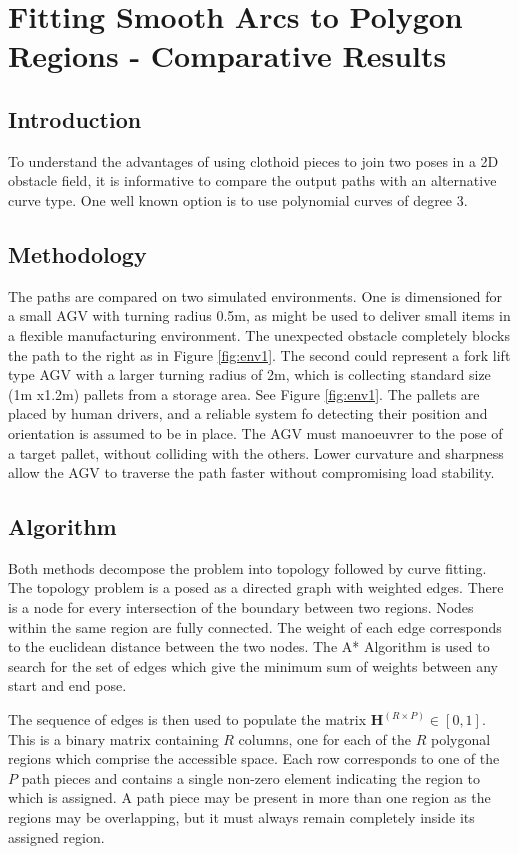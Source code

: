 \chapter{Fitting Smooth Arcs to Polygon Regions - Comparative Results}

\section{Introduction}
To understand the advantages of using clothoid pieces to join two poses in a 2D obstacle field, it is informative to compare the output paths with an alternative curve type. One well known option is to use polynomial curves of  degree 3. 

\section{Methodology}
The paths are compared on two simulated environments. One is dimensioned for a small AGV with turning radius 0.5m, as might be used to deliver small items in a flexible manufacturing environment. The unexpected obstacle completely blocks the path to the right as in Figure \ref{fig:env1}. The second could represent a fork lift type AGV with a larger turning radius of 2m, which is collecting standard size (1m x1.2m) pallets from a storage area. See Figure \ref{fig:env1}. The pallets are placed by human drivers, and a reliable system fo detecting their position and orientation is assumed to be in place. The AGV must manoeuvrer to the pose of a target pallet, without colliding with the others. Lower curvature and sharpness allow the AGV to traverse the path faster without compromising load stability.

\section{Algorithm}
Both methods decompose the problem into topology followed by curve fitting. The topology problem is a posed as a directed graph with weighted edges. There is a node for every intersection of the boundary between two regions. Nodes within the same region are fully connected. The weight of each edge corresponds to the euclidean distance between the two nodes. The A* Algorithm is used to search for the set of edges which give the minimum sum of weights between any start and end pose.

The sequence of edges is then used to populate the matrix $\bm{H} ^{(R \times P)} \in [0,1]$. This is a binary matrix containing $R$ columns, one for each of the $R$ polygonal regions which comprise the accessible space. Each row corresponds to one of the $P$ path pieces and contains a single non-zero element indicating the region to which is assigned. A path piece may be present in more than one region as the regions may be overlapping, but it must always remain completely inside its assigned region.

